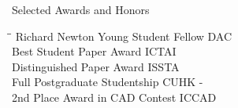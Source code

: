 
\begin{rSection}{Selected Awards and Honors}
\begin{tabbing}
\hspace{3.6in}\= \hspace{2.1in}\= \kill
Richard Newton Young Student Fellow    \> DAC  \\
Best Student Paper Award                       \> ICTAI                       \\
Distinguished Paper Award                      \>ISSTA                      \\
Full Postgraduate Studentship   \>CUHK  -\\
     2nd Place Award in CAD Contest               \> ICCAD                       \\


\end{tabbing}
\end{rSection}
